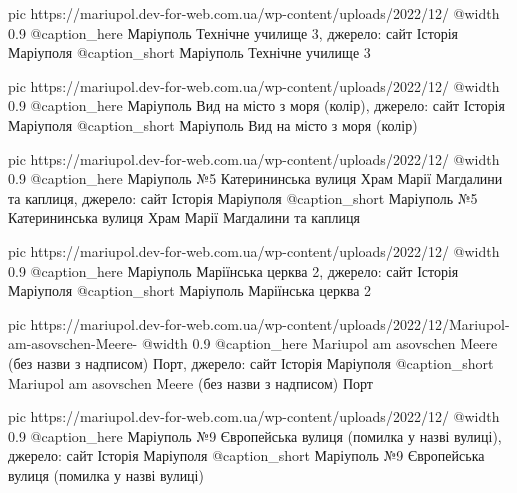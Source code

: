 	pic https://mariupol.dev-for-web.com.ua/wp-content/uploads/2022/12/%
	@width 0.9
	@caption_here Маріуполь Технічне училище 3, джерело: сайт Історія Маріуполя
	@caption_short Маріуполь Технічне училище 3

	pic https://mariupol.dev-for-web.com.ua/wp-content/uploads/2022/12/%
	@width 0.9
	@caption_here Маріуполь Вид на місто з моря (колір), джерело: сайт Історія Маріуполя
	@caption_short Маріуполь Вид на місто з моря (колір)

	pic https://mariupol.dev-for-web.com.ua/wp-content/uploads/2022/12/%
	@width 0.9
	@caption_here Маріуполь №5 Катерининська вулиця Храм Марії Магдалини та каплиця, джерело: сайт Історія Маріуполя
	@caption_short Маріуполь №5 Катерининська вулиця Храм Марії Магдалини та каплиця

	pic https://mariupol.dev-for-web.com.ua/wp-content/uploads/2022/12/%
	@width 0.9
	@caption_here Маріуполь Маріїнська церква 2, джерело: сайт Історія Маріуполя
	@caption_short Маріуполь Маріїнська церква 2

	pic https://mariupol.dev-for-web.com.ua/wp-content/uploads/2022/12/Mariupol-am-asovschen-Meere-%
	@width 0.9
	@caption_here Mariupol am asovschen Meere (без назви з надписом) Порт, джерело: сайт Історія Маріуполя
	@caption_short Mariupol am asovschen Meere (без назви з надписом) Порт

	pic https://mariupol.dev-for-web.com.ua/wp-content/uploads/2022/12/%
	@width 0.9
	@caption_here Маріуполь №9 Європейська вулиця (помилка у назві вулиці), джерело: сайт Історія Маріуполя
	@caption_short Маріуполь №9 Європейська вулиця (помилка у назві вулиці)

